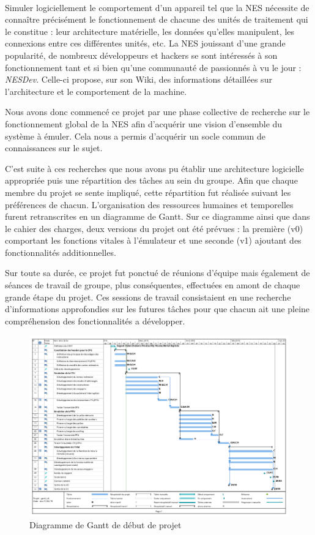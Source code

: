\paragraph{}

Simuler logiciellement le comportement d'un appareil tel que la NES nécessite de connaître précisément le fonctionnement de chacune des unités de traitement qui le constitue : leur architecture matérielle, les données qu'elles manipulent, les connexions entre ces différentes unités, etc. La NES jouissant d'une grande popularité, de nombreux développeurs et hackers se sont intéressés à son fonctionnement tant et si bien qu'une communauté de passionnés à vu le jour : \emph{NESDev}. Celle-ci propose, sur son Wiki, des informations détaillées sur l'architecture et le comportement de la machine.

Nous avons donc commencé ce projet par une phase collective de recherche sur le fonctionnement global de la NES afin d'acquérir une vision d'ensemble du système à émuler. Cela nous a permis d'acquérir un socle commun de connaissances sur le sujet.

C'est suite à ces recherches que nous avons pu établir une architecture logicielle appropriée puis une répartition des tâches au sein du groupe. Afin que chaque membre du projet se sente impliqué, cette répartition fut réalisée suivant les préférences de chacun. L'organisation des ressources humaines et temporelles furent retranscrites en un diagramme de Gantt. Sur ce diagramme ainsi que dans le cahier des charges, deux versions du projet ont été prévues : la première (v0) comportant les fonctions vitales à l'émulateur et une seconde (v1) ajoutant des fonctionnalités additionnelles.

Sur toute sa durée, ce projet fut ponctué de réunions d'équipe mais également de séances de travail de groupe, plus conséquentes, effectuées en amont de chaque grande étape du projet. Ces sessions de travail consistaient en une recherche d'informations approfondies sur les futures tâches pour que chacun ait une pleine compréhension des fonctionnalités a développer.

\begin{figure}[h]
  \centering
   \includegraphics[scale=0.45]{GanttV1.png}
   \caption{\label{etiquette} Diagramme de Gantt de début de projet}
\end{figure}
